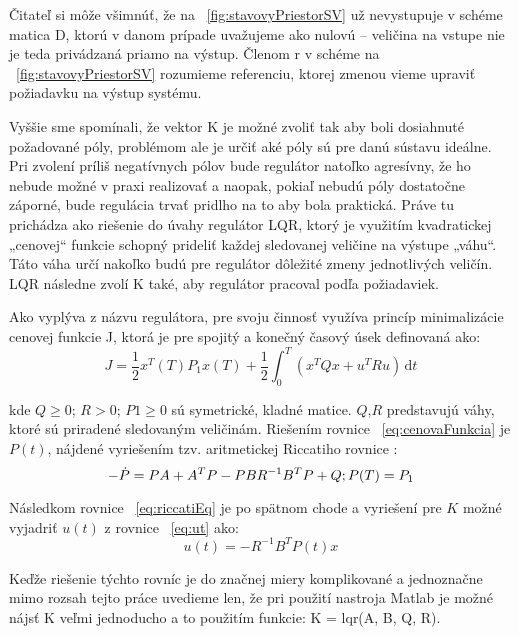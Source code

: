 Čitateľ si môže všimnúť, že na \figurename~\ref{fig:stavovyPriestorSV} už nevystupuje v schéme matica D, ktorú v danom prípade uvažujeme ako nulovú – veličina na vstupe nie je teda privádzaná priamo na výstup. Členom r v schéme na \figurename~\ref{fig:stavovyPriestorSV} rozumieme referenciu, ktorej zmenou vieme upraviť požiadavku na výstup systému.

Vyššie sme spomínali, že vektor K je možné zvoliť tak aby boli dosiahnuté požadované póly, problémom ale je určiť aké póly sú pre danú sústavu ideálne. Pri zvolení príliš negatívnych pólov bude regulátor natoľko agresívny, že ho nebude možné v praxi realizovať a naopak, pokiaľ nebudú póly dostatočne záporné, bude regulácia trvať pridlho na to aby bola praktická.  Práve tu prichádza ako riešenie do úvahy regulátor LQR, ktorý je využitím kvadratickej „cenovej“ funkcie schopný prideliť každej sledovanej veličine na výstupe „váhu“. Táto váha určí nakoľko budú pre regulátor dôležité zmeny jednotlivých veličín. LQR následne zvolí K také, aby regulátor pracoval podľa požiadaviek.

Ako vyplýva z názvu regulátora, pre svoju činnosť využíva princíp minimalizácie cenovej funkcie J, ktorá je pre spojitý a konečný časový úsek definovaná ako:
\begin{equation}
J = \dfrac {1} {2} x^T (T)P_1 x(T)  + \dfrac {1} {2} \int_0^T \! ( x^T Qx + u^T Ru) \, \mathrm{d}t 
\label{eq:cenovaFunkcia}
\end{equation}

kde $Q \geq 0$; $R > 0$; $P1 \geq 0$ sú symetrické, kladné matice. $Q$,$ R$ predstavujú váhy, ktoré sú priradené sledovaným veličinám.
Riešením rovnice \figurename~\ref{eq:cenovaFunkcia} je $P(t)$, nájdené vyriešením tzv. aritmetickej Riccatiho rovnice :
\begin{equation}
- \dot {P} = PA + A^T P - PBR^{-1} B^T P + Q;	\\
P( T ) = P_1
\label{eq:riccatiEq}
\end{equation}

Následkom rovnice \figurename~\ref{eq:riccatiEq} je po spätnom chode a vyriešení pre $K$ možné vyjadriť $u(t)$ z rovnice \figurename~\ref{eq:ut} ako:
\begin{equation}
u( t ) = -R^{-1} B^T P( t )x
\end{equation}

Keďže riešenie týchto rovníc je do značnej miery komplikované a jednoznačne mimo rozsah tejto práce uvedieme len, že pri použití nastroja Matlab je možné nájsť K veľmi jednoducho a to použitím funkcie: K = lqr(A, B, Q, R).

